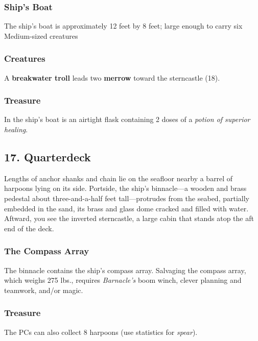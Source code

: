 \documentclass[10pt,a4paper,twoside,bg=print,twocolumn,openany,nodeprecatedcode]{dndbook}
\begin{document}
\subsubsection{Ship's Boat}
The ship's boat is approximately 12 feet by 8 feet; large enough to carry six Medium-sized creatures

\subsubsection{Creatures}
A \textbf{breakwater troll} leads two \textbf{merrow} toward the sterncastle (18).

\subsubsection{Treasure}
In the ship's boat is an airtight flask containing 2 doses of a \textit{potion of superior healing}.

\subsection{17. Quarterdeck}
\begin{DndReadAloud}{}
Lengths of anchor shanks and chain lie on the seafloor nearby a barrel of harpoons lying on its side. Portside, the ship's binnacle—a wooden and brass pedestal about three-and-a-half feet tall—protrudes from the seabed, partially embedded in the sand, its brass and glass dome cracked and filled with water. Aftward, you see the inverted sterncastle, a large cabin that stands atop the aft end of the deck.

\end{DndReadAloud}

\subsubsection{The Compass Array}
The binnacle contains the ship's compass array. Salvaging the compass array, which weighs 275 lbs., requires \textit{Barnacle's} boom winch, clever planning and teamwork, and/or magic.

\subsubsection{Treasure}
The PCs can also collect 8 harpoons (use statistics for \textit{spear}).
\end{document}
